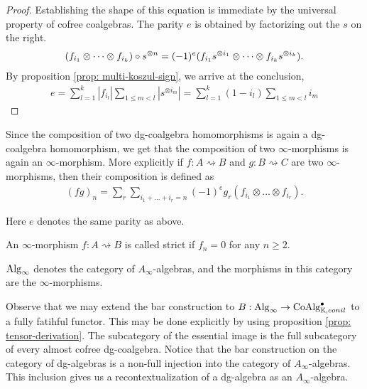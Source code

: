 \documentclass[../thesis.tex]{subfiles}
\begin{document}
        \begin{proof}
            Establishing the shape of this equation is immediate by the universal property of cofree coalgebras. The parity $e$ is obtained by factorizing out the $s$ on the right.
            \begin{align*}
                (f_{i_1} \otimes \cdots \otimes f_{i_k}) \circ s^{\otimes n} = (-1)^e(f_{i_1}s^{\otimes i_1} \otimes \cdots \otimes f_{i_k}s^{\otimes i_k})\tt{.}
            \end{align*}
            By proposition \ref{prop: multi-koszul-sign}, we arrive at the conclusion,
            \begin{align*}
                e = \sum_{l = 1}^k|f_{i_l}|\sum_{1\leq m < l}|s^{\otimes i_m}|= \sum_{l = 1}^k(1- i_l)\sum_{1 \leq m < l}i_m
            \end{align*}
        \end{proof}

        Since the composition of two dg-coalgebra homomorphisms is again a dg-coalgebra homomorphism, we get that the composition of two $\infty$-morphisms is again an $\infty$-morphism. More explicitly if $f:A\rightsquigarrow B$ and $g: B\rightsquigarrow C$ are two $\infty$-morphisms, then their composition is defined as
        \begin{align*}
            (fg)_n = \sum_r\sum_{i_1 + ... + i_r = n} (-1)^eg_r(f_{i_1}\otimes ... \otimes f_{i_r})\text{.}
        \end{align*}

        Here $e$ denotes the same parity as above.

        \begin{definition}
            An $\infty$-morphism $f: A\rightsquigarrow B$ is called strict if $f_n = 0$ for any $n\geq 2$. 
        \end{definition}

        \begin{definition}
            $\tt{Alg}_\infty$ denotes the category of $A_\infty$-algebras, and the morphisms in this category are the $\infty$-morphisms.
        \end{definition}

        Observe that we may extend the bar construction to $B : \tt{Alg}_\infty \rightarrow \tt{Co\tt{Alg}}_{\mathbb{K},conil}^\bullet$ to a fully fatihful functor. This may be done explicitly by using proposition \ref{prop: tensor-derivation}. The subcategory of the essential image is the full subcategory of every almost cofree dg-coalgebra. Notice that the bar construction on the category of dg-algebras is a non-full injection into the category of $A_\infty$-algebras. This inclusion gives us a recontextualization of a dg-algebra as an $A_\infty$-algebra.
\end{document}
